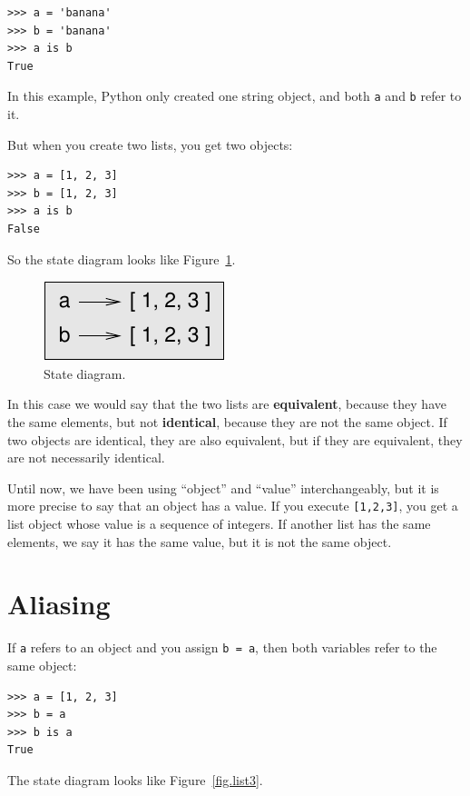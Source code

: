 \documentclass[10pt]{book}
\begin{document}
\begin{verbatim}
>>> a = 'banana'
>>> b = 'banana'
>>> a is b
True
\end{verbatim}
%
In this example, Python only created one string object,
and both {\tt a} and {\tt b} refer to it.

But when you create two lists, you get two objects:

\begin{verbatim}
>>> a = [1, 2, 3]
>>> b = [1, 2, 3]
>>> a is b
False
\end{verbatim}
%
So the state diagram looks like Figure~\ref{fig.list2}.

\begin{figure}
\centerline
{\includegraphics[scale=0.8]{figs/list2.pdf}}
\caption{State diagram.}
\label{fig.list2}
\end{figure}


In this case we would say that the two lists are {\bf equivalent},
because they have the same elements, but not {\bf identical}, because
they are not the same object.  If two objects are identical, they are
also equivalent, but if they are equivalent, they are not necessarily
identical.

Until now, we have been using ``object'' and ``value''
interchangeably, but it is more precise to say that an object has a
value.  If you execute {\tt [1,2,3]}, you get a list
object whose value is a sequence of integers.  If another
list has the same elements, we say it has the same value, but
it is not the same object.


\section{Aliasing}

If {\tt a} refers to an object and you assign {\tt b = a},
then both variables refer to the same object:

\begin{verbatim}
>>> a = [1, 2, 3]
>>> b = a
>>> b is a
True
\end{verbatim}
%
The state diagram looks like Figure~\ref{fig.list3}.
\end{document}

